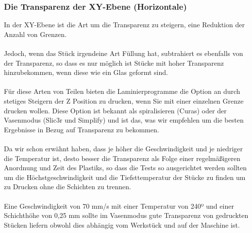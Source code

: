 \documentclass[11pt,a4paper]{article}
\begin{document}
		\subsubsection{Die Transparenz der XY-Ebene (Horizontale)}In der XY-Ebene ist die Art um die Transparenz zu steigern, eine Reduktion der Anzahl von Grenzen.
\\\\
Jedoch, wenn das Stück irgendeine Art Füllung hat, subtrahiert es ebenfalls von der Transparenz, so dass es nur möglich ist Stücke mit hoher Transparenz hinzubekommen, wenn diese wie ein Glas geformt sind. 
\\\\
Für diese Arten von Teilen bieten die Laminierprogramme die Option an durch stetiges Steigern der Z Position zu drucken, wenn Sie mit einer einzelnen Grenze drucken wollen. Diese Option ist bekannt als spiralisieren (Curas) oder der Vasenmodus (Slic3r und Simplify) und ist das, was wir empfehlen um die besten Ergebnisse in Bezug auf Transparenz zu bekommen.
\\\\
Da wir schon erwähnt haben, dass je höher die Geschwindigkeit und je niedriger die Temperatur ist, desto besser die Transparenz als Folge einer regelmäßigeren Anordnung und Zeit des Plastiks, so dass die Tests so ausgerichtet werden sollten um die Höchstgeschwindigkeit und die Tiefsttemperatur der Stücke zu finden um zu Drucken ohne die Schichten zu trennen. 
\\\\
Eine Geschwindigkeit von 70 mm/s mit einer Temperatur von 240º und einer Schichthöhe von 0,25 mm sollte im Vasenmodus gute Transparenz von gedruckten Stücken liefern obwohl dies abhängig vom Werkstück und auf der Maschine ist.
\end{document}
